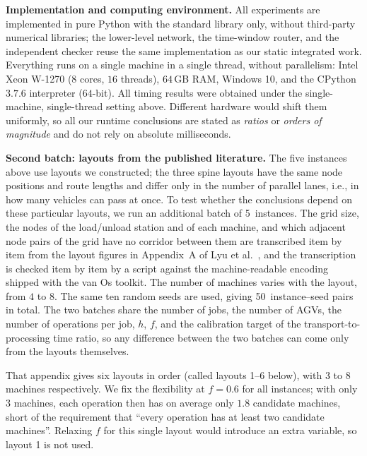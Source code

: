 \documentclass[manuscript,screen,review]{acmart}
\newcommand{\NPubInst}{5}
\newcommand{\NPubPairs}{50}
\begin{document}
\textbf{Implementation and computing environment.}
All experiments are implemented in pure Python with the standard library only, without third-party numerical libraries; the lower-level network, the time-window router, and the independent checker
reuse the same implementation as our static integrated work. Everything runs on a single machine in a single thread, without parallelism: Intel Xeon W-1270
(\(8\) cores, \(16\) threads), \(64\)\,GB RAM, Windows 10, and the CPython \(3.7.6\) interpreter (\(64\)-bit).
All timing results were obtained under the single-machine, single-thread setting above.
Different hardware would shift them uniformly, so all our runtime conclusions are stated as \emph{ratios} or \emph{orders of magnitude} and do not rely on absolute milliseconds.

\textbf{Second batch: layouts from the published literature.}
The five instances above use layouts we constructed; the three spine layouts have the same node positions and route lengths and differ only in the number of parallel lanes, i.e., in how many vehicles can pass at once.
To test whether the conclusions depend on these particular layouts, we run an additional batch of \NPubInst\ instances. The grid size, the nodes of the load/unload station and of each machine, and which adjacent node pairs of the grid have no corridor between them
are transcribed item by item from the layout figures in Appendix~A of Lyu et al.~\cite{lyu2019approach}, and the transcription is checked item by item by a script against the machine-readable encoding
shipped with the van Os toolkit. The number of machines varies with the layout, from \(4\) to \(8\).
The same ten random seeds are used, giving \NPubPairs\ instance--seed pairs in total. The two batches share the number of jobs,
the number of AGVs, the number of operations per job, \(h\), \(f\), and the calibration target of the transport-to-processing time ratio,
so any difference between the two batches can come only from the layouts themselves.

That appendix gives six layouts in order (called layouts 1--6 below), with \(3\) to \(8\) machines respectively. We fix the flexibility at \(f=0.6\) for all instances;
with only \(3\) machines, each operation then has on average only \(1.8\) candidate machines, short of the requirement that ``every operation has at least two candidate machines''.
Relaxing \(f\) for this single layout would introduce an extra variable, so layout 1 is not used.
\end{document}
